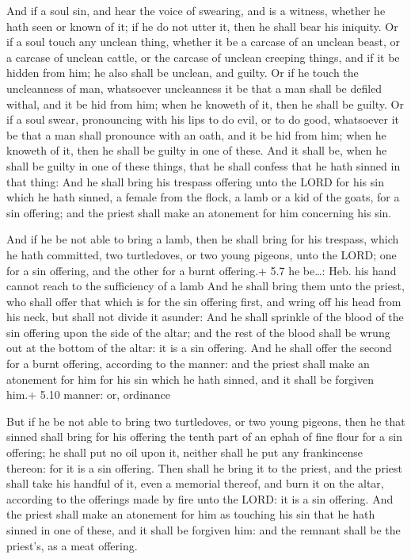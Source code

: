  And if a soul sin, and hear the voice of swearing, and is a
witness, whether he hath seen or known of it; if he do not utter it,
then he shall bear his iniquity.  Or if a soul touch any
unclean thing, whether it be a carcase of an unclean beast, or a carcase
of unclean cattle, or the carcase of unclean creeping things, and if it
be hidden from him; he also shall be unclean, and guilty. 
Or if he touch the uncleanness of man, whatsoever uncleanness it be that
a man shall be defiled withal, and it be hid from him; when he knoweth
of it, then he shall be guilty.  Or if a soul swear,
pronouncing with his lips to do evil, or to do good, whatsoever it be
that a man shall pronounce with an oath, and it be hid from him; when he
knoweth of it, then he shall be guilty in one of these.  And
it shall be, when he shall be guilty in one of these things, that he
shall confess that he hath sinned in that thing:  And he
shall bring his trespass offering unto the LORD for his sin which he
hath sinned, a female from the flock, a lamb or a kid of the goats, for
a sin offering; and the priest shall make an atonement for him
concerning his sin.

 And if he be not able to bring a lamb, then he shall bring
for his trespass, which he hath committed, two turtledoves, or two young
pigeons, unto the LORD; one for a sin offering, and the other for a
burnt offering.+ 5.7 he be\ldots: Heb. his hand cannot reach to the
sufficiency of a lamb  And he shall bring them unto the
priest, who shall offer that which is for the sin offering first, and
wring off his head from his neck, but shall not divide it asunder:
 And he shall sprinkle of the blood of the sin offering upon
the side of the altar; and the rest of the blood shall be wrung out at
the bottom of the altar: it is a sin offering.  And he
shall offer the second for a burnt offering, according to the manner:
and the priest shall make an atonement for him for his sin which he hath
sinned, and it shall be forgiven him.+ 5.10 manner: or, ordinance

 But if he be not able to bring two turtledoves, or two
young pigeons, then he that sinned shall bring for his offering the
tenth part of an ephah of fine flour for a sin offering; he shall put no
oil upon it, neither shall he put any frankincense thereon: for it is a
sin offering.  Then shall he bring it to the priest, and
the priest shall take his handful of it, even a memorial thereof, and
burn it on the altar, according to the offerings made by fire unto the
LORD: it is a sin offering.  And the priest shall make an
atonement for him as touching his sin that he hath sinned in one of
these, and it shall be forgiven him: and the remnant shall be the
priest's, as a meat offering.

